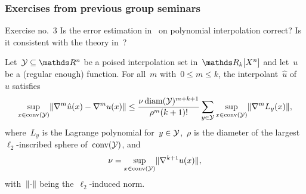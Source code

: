 \documentclass{polyu-presentation}
\newcommand{\xpt}[1][]{\mathcal{Y}\ifthenelse{\equal{#1}{}}{}{^{#1}}}
\begin{document}
\begin{frame}
    \frametitle{Exercises from previous group seminars}

    \begin{block}{Exercise no.\ 3}
        Is the \alert{error estimation} in~\cite{Conn_Scheinberg_Vicente_2009b} on polynomial interpolation correct?
        Is it \alert{consistent} with the theory in~\cite{Ciarlet_Raviart_1972}?
    \end{block}

    Let~$\xpt \subseteq \R^n$ be a \alert{poised} interpolation set in~$\R_k[X^n]$ and let~$u$ be a (regular enough) function.
    For all~$m$ with~$0 \le m \le k$, the interpolant~$\hat{u}$ of~$u$ satisfies
    \begin{equation*}
        \sup_{x \in \conv(\xpt)} \norm{\nabla^m \hat{u}(x) - \nabla^m u(x)} \le \frac{\nu \diam(\xpt)^{m + k + 1}}{\rho^m (k + 1)!} \sum_{y \in \xpt} \sup_{x \in \conv(\xpt)} \norm{\nabla^m L_y(x)},
    \end{equation*}
    where~$L_y$ is the \alert{Lagrange polynomial} for~$y \in \xpt$,~$\rho$ is the diameter of the largest~$\ell_2$-inscribed sphere of~$\conv(\xpt)$, and
    \begin{equation*}
        \nu = \sup_{x \in \conv(\xpt)} \norm{\nabla^{k + 1} u(x)},
    \end{equation*}
    with~$\lVert\cdot\rVert$ being the~$\ell_2$-induced norm.
\end{frame}
\end{document}
